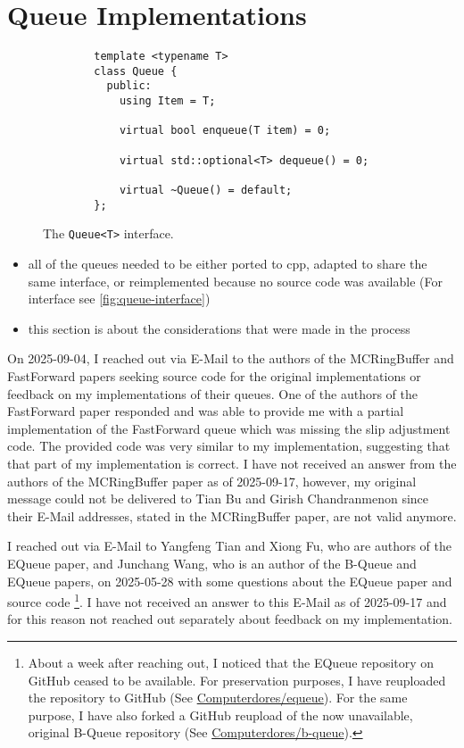 \section{Queue Implementations}
\begin{figure}
    \begin{verbatim}
        template <typename T>
        class Queue {
          public:
            using Item = T;

            virtual bool enqueue(T item) = 0;

            virtual std::optional<T> dequeue() = 0;

            virtual ~Queue() = default;
        };
    \end{verbatim}
    \caption{The \texttt{Queue<T>} interface.}
    \label{fig:queue-interface}
\end{figure}

\begin{itemize}
    \item all of the queues needed to be either ported to cpp, adapted to share the same interface, or
        reimplemented because no source code was available (For interface see \autoref{fig:queue-interface})
    \item this section is about the considerations that were made in the process
\end{itemize}

On 2025-09-04, I reached out via E-Mail to the authors of the MCRingBuffer and FastForward papers seeking
source code for the original implementations or feedback on my implementations of their queues.
One of the authors of the FastForward paper responded and was able to provide me with a partial
implementation of the FastForward queue which was missing the slip adjustment code.
The provided code was very similar to my implementation, suggesting that that part of my implementation is correct.
I have not received an answer from the authors of the MCRingBuffer paper as of 2025-09-17, however, my
original message could not be delivered to Tian Bu and Girish Chandranmenon since their E-Mail addresses,
stated in the MCRingBuffer paper, are not valid anymore.

I reached out via E-Mail to Yangfeng Tian and Xiong Fu, who are authors of the EQueue paper, and Junchang
Wang, who is an author of the B-Queue and EQueue papers, on 2025-05-28 with some questions about the EQueue
paper and source code
\footnote{About a week after reaching out, I noticed that the EQueue repository on GitHub ceased to be available.
For preservation purposes, I have reuploaded the repository to GitHub (See \href{https://github.com/Computerdores/equeue}{Computerdores/equeue}).
For the same purpose, I have also forked a GitHub reupload of the now unavailable, original B-Queue repository (See \href{https://github.com/Computerdores/b-queue}{Computerdores/b-queue}).}.
I have not received an answer to this E-Mail as of 2025-09-17 and for this reason not reached out separately
about feedback on my implementation.

